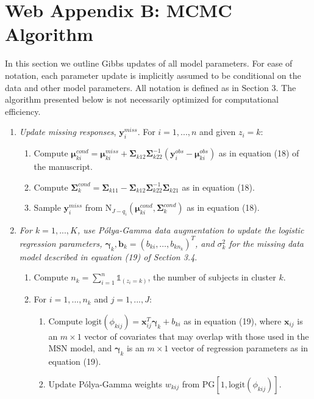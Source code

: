 \documentclass[useAMS,11pt]{article}
\newcommand{\1}{\mathbbm{1}}
\begin{document}
\section*{Web Appendix B: MCMC Algorithm}

In this section we outline Gibbs updates of all model parameters. For ease of notation, each parameter update is implicitly assumed to be conditional on the data and other model parameters. All notation is defined as in Section 3. The algorithm presented below is not necessarily optimized for computational efficiency.

\begin{enumerate}
	\item \textit{Update missing responses}, $\mathbf{y}_i^{miss}$. For $i = 1,...,n$ and given $z_i=k$:
	\begin{enumerate}
		\item Compute $\boldsymbol\mu^{cond}_{ki}= \boldsymbol\mu^{miss}_{ki} + \boldsymbol\Sigma_{k12} \boldsymbol\Sigma_{k22}^{-1}(\mathbf{y}^{obs}_i - \boldsymbol\mu^{obs}_{ki})$ as in equation (18) of the manuscript.
		\item Compute $\boldsymbol\Sigma^{cond}_k= \boldsymbol\Sigma_{k11} - \boldsymbol\Sigma_{k12}\boldsymbol\Sigma_{k22}^{-1}\boldsymbol\Sigma_{k21}$ as in equation (18).
		\item Sample $\mathbf{y}^{miss}_i$ from $ \text{N}_{J-q_i}(\boldsymbol\mu^{cond}_{ki},\boldsymbol\Sigma^{cond}_k)$ as in equation (18).
	\end{enumerate}
	\item  \textit{For $k = 1,...,K$, use P\'olya-Gamma data augmentation to update the logistic regression parameters, $\boldsymbol\gamma_k, \mathbf{b}_k=(b_{ki},\ldots,b_{kn_k})^T$, and $\sigma^2_k$ for the missing data model described in equation (19) of Section 3.4}.
	\begin{enumerate}
		\item Compute $n_k = \sum_{i = 1}^n \mathds{1}_{(z_i = k)}$, the number of subjects in cluster $k$.
		\item For $i = 1,...,n_k$ and $j = 1,...,J$:
		\begin{enumerate}
			\item Compute $\text{logit}(\phi_{kij})=\mathbf{x}^T_{ij}\boldsymbol\gamma_k+b_{ki}$ as in equation (19), where $\mathbf{x}_{ij}$ is an $m \times 1$ vector of covariates that may overlap with those used in the MSN model, and $\boldsymbol\gamma_k$ is an $m \times 1$ vector of regression parameters as in equation (19).
			\item Update P\'olya-Gamma weights $w_{kij}$ from $\text{PG}[1,\text{logit}(\phi_{kij})]$.

\end{enumerate}
\end{enumerate}
\end{enumerate}
\end{document}
